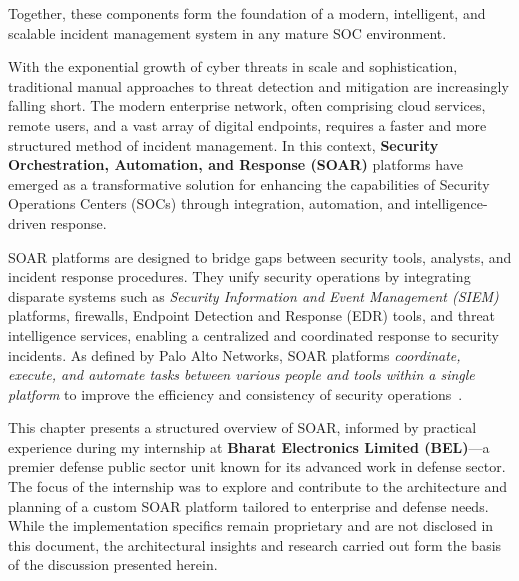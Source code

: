 Together, these components form the foundation of a modern, intelligent, and scalable incident management system in any mature SOC environment.

With the exponential growth of cyber threats in scale and sophistication, traditional manual approaches to threat detection and mitigation are increasingly falling short. The modern enterprise network, often comprising cloud services, remote users, and a vast array of digital endpoints, requires a faster and more structured method of incident management. In this context, \textbf{Security Orchestration, Automation, and Response (SOAR)} platforms have emerged as a transformative solution for enhancing the capabilities of Security Operations Centers (SOCs) through integration, automation, and intelligence-driven response.

SOAR platforms are designed to bridge gaps between security tools, analysts, and incident response procedures. They unify security operations by integrating disparate systems such as \textit{Security Information and Event Management (SIEM)} platforms, firewalls, Endpoint Detection and Response (EDR) tools, and threat intelligence services, enabling a centralized and coordinated response to security incidents. As defined by Palo Alto Networks, SOAR platforms \textit{coordinate, execute, and automate tasks between various people and tools within a single platform} to improve the efficiency and consistency of security operations~\cite{paloalto}.

This chapter presents a structured overview of SOAR, informed by practical experience during my internship at \textbf{Bharat Electronics Limited (BEL)}—a premier defense public sector unit known for its advanced work in defense sector. The focus of the internship was to explore and contribute to the architecture and planning of a custom SOAR platform tailored to enterprise and defense needs. While the implementation specifics remain proprietary and are not disclosed in this document, the architectural insights and research carried out form the basis of the discussion presented herein.

